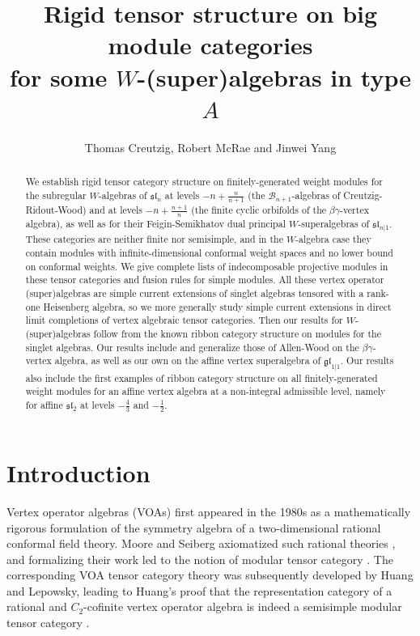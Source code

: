 \documentclass[11pt, reqno]{amsart}
\title[Big module categories for $W$-(super)algebras]{Rigid tensor structure on big module categories\\ for some $W$-(super)algebras in type $A$}
\author{Thomas Creutzig, Robert McRae and Jinwei Yang}
\date{}
\theoremstyle{definition}\newtheorem{defi}[thm]{Definition}
\theoremstyle{definition}\newtheorem{rem}[thm]{Remark}
\theoremstyle{definition}\newtheorem{exam}[thm]{Example}
\theoremstyle{definition}\newtheorem{assum}[thm]{Assumption}
\begin{document}





 \begin{abstract}
We establish rigid tensor category structure on finitely-generated weight modules for the subregular $W$-algebras of 
 $\mathfrak{sl}_n$ at levels $ - n + \frac{n}{n+1}$ (the $\mathcal B_{n+1}$-algebras of  Creutzig-Ridout-Wood) and at levels $- n + \frac{n+1}{n}$ (the finite cyclic orbifolds of the $\beta\gamma$-vertex algebra), as well as for their Feigin-Semikhatov dual principal $W$-superalgebras of $\mathfrak{sl}_{n|1}$. 
 These categories are neither finite nor semisimple, and in the $W$-algebra case they contain modules with infinite-dimensional conformal weight spaces and no lower bound on conformal weights. 
 We give complete lists of indecomposable projective modules in these tensor categories and fusion rules for simple modules. All these vertex operator (super)algebras are simple current extensions of singlet algebras tensored with a rank-one Heisenberg algebra, so we more generally study
 simple current extensions in direct limit completions of vertex algebraic tensor categories. Then our results for $W$-(super)algebras follow from the known ribbon category structure on modules for the singlet algebras. Our results include and generalize those of Allen-Wood on the $\beta\gamma$-vertex algebra, as well as our own on the affine vertex superalgebra of $\mathfrak{gl}_{1|1}$. Our results also include the first examples of ribbon category structure on all finitely-generated weight modules for an affine vertex algebra at a non-integral admissible level, namely for affine $\mathfrak{sl}_2$ at levels $-\frac{4}{3}$ and $-\frac{1}{2}$.
\end{abstract}

\maketitle

\tableofcontents


\section{Introduction}

Vertex operator algebras (VOAs) first appeared in the 1980s as a mathematically rigorous formulation of the symmetry algebra of a two-dimensional rational conformal field theory. 
Moore and Seiberg axiomatized 
such rational  theories \cite{MS}, and formalizing their work led to the notion of modular tensor category \cite{Tu}. 
The corresponding VOA tensor category theory was subsequently developed by Huang and Lepowsky, leading to Huang's proof that the representation category of a rational and $C_2$-cofinite vertex operator algebra is indeed a  semisimple modular tensor category \cite{Hu-rig-mod}. 
\end{document}
